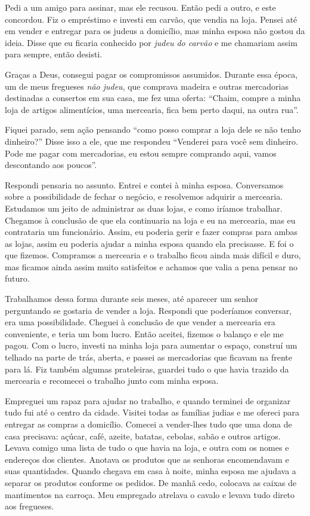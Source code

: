 Pedi a um amigo para assinar, mas ele recusou. Então pedi a outro, e
este concordou. Fiz o empréstimo e investi em carvão, que vendia na loja.
Pensei até em vender e entregar para os judeus a domicílio, mas minha
esposa não gostou da ideia. Disse que eu ficaria conhecido por
\textit{judeu do carvão} e me chamariam assim para sempre, então desisti.

Graças a Deus, consegui pagar os compromissos assumidos. Durante essa época, um 
de meus fregueses \textit{não judeu}, que comprava madeira e outras
mercadorias destinadas a consertos em sua casa, me fez uma oferta: ``Chaim,
compre a minha loja de artigos alimentícios, uma mercearia, fica bem
perto daqui, na outra rua''.

Fiquei parado, sem ação pensando ``como posso comprar a loja dele se
não tenho dinheiro?'' Disse isso a ele, que me respondeu ``Venderei
para você sem dinheiro. Pode me pagar com mercadorias, eu estou
sempre comprando aqui, vamos descontando aos poucos''.

Respondi pensaria no assunto. Entrei e contei à minha esposa. Conversamos sobre a possibilidade de
fechar o negócio, e resolvemos adquirir a mercearia. Estudamos um
jeito de administrar as duas lojas, e como iríamos trabalhar. Chegamos à
conclusão de que ela continuaria na loja e eu na mercearia, mas
eu contrataria um funcionário. Assim, eu poderia gerir e fazer compras para ambas as lojas, 
assim eu poderia ajudar a minha esposa quando ela precisasse. E foi o que fizemos. Compramos a mercearia
e o trabalho ficou ainda mais difícil e duro, mas ficamos ainda assim 
muito satisfeitos e achamos que valia a pena pensar no futuro.

Trabalhamos dessa forma durante seis meses, até aparecer um senhor perguntando se 
gostaria de vender a loja. Respondi que poderíamos conversar, era uma possibilidade.
Cheguei à conclusão de que vender a mercearia era conveniente, e teria um bom lucro. 
Então aceitei, fizemos o balanço e ele me pagou. Com o lucro, investi
na minha loja para aumentar o espaço, construí um telhado na parte de trás, aberta, 
e passei as mercadorias que ficavam na frente para lá. Fiz também 
algumas prateleiras, guardei tudo o que havia trazido da mercearia e
recomecei o trabalho junto com minha esposa.

Empreguei um rapaz para ajudar no trabalho, e quando terminei de organizar tudo fui
até o centro da cidade. Visitei todas as famílias judias e me ofereci para entregar as compras a
domicílio. Comecei a vender-lhes tudo que uma dona de casa precisava:
açúcar, café, azeite, batatas, cebolas, sabão e outros artigos. Levava
comigo uma lista de tudo o que havia na loja, e outra com os nomes e endereços
dos clientes. Anotava os produtos que as senhoras encomendavam e suas 
quantidades. Quando chegava em casa à noite, minha
esposa me ajudava a separar os produtos conforme os pedidos. De manhã
cedo, colocava as caixas de mantimentos na carroça. Meu empregado
atrelava o cavalo e levava tudo direto aos fregueses.

